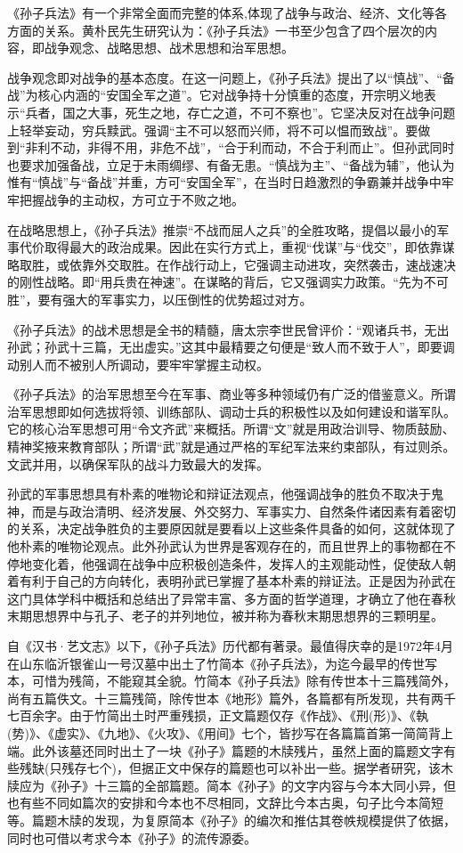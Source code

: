 \documentclass[12pt,UTF8]{ctexbook}
\begin{document}
《孙子兵法》有一个非常全面而完整的体系,体现了战争与政治、经济、文化等各方面的关系。黄朴民先生研究认为：《孙子兵法》一书至少包含了四个层次的内容，即战争观念、战略思想、战术思想和治军思想。

战争观念即对战争的基本态度。在这一问题上，《孙子兵法》提出了以“慎战”、“备战”为核心内涵的“安国全军之道”。它对战争持十分慎重的态度，开宗明义地表示“兵者，国之大事，死生之地，存亡之道，不可不察也”。它坚决反对在战争问题上轻举妄动，穷兵黩武。强调“主不可以怒而兴师，将不可以愠而致战”。要做到“非利不动，非得不用，非危不战”，“合于利而动，不合于利而止”。但孙武同时也要求加强备战，立足于未雨绸缪、有备无患。“慎战为主”、“备战为辅”，他认为惟有“慎战”与“备战”并重，方可“安国全军”，在当时日趋激烈的争霸兼并战争中牢牢把握战争的主动权，方可立于不败之地。

在战略思想上，《孙子兵法》推崇“不战而屈人之兵”的全胜攻略，提倡以最小的军事代价取得最大的政治成果。因此在实行方式上，重视“伐谋”与“伐交”，即依靠谋略取胜，或依靠外交取胜。在作战行动上，它强调主动进攻，突然袭击，速战速决的刚性战略。即“用兵贵在神速”。在谋略的背后，它又强调实力政策。“先为不可胜”，要有强大的军事实力，以压倒性的优势超过对方。

《孙子兵法》的战术思想是全书的精髓，唐太宗李世民曾评价：“观诸兵书，无出孙武；孙武十三篇，无出虚实。”这其中最精要之句便是“致人而不致于人”，即要调动别人而不被别人所调动，要牢牢掌握主动权。

《孙子兵法》的治军思想至今在军事、商业等多种领域仍有广泛的借鉴意义。所谓治军思想即如何选拔将领、训练部队、调动士兵的积极性以及如何建设和谐军队。它的核心治军思想可用“令文齐武”来概括。所谓“文”就是用政治训导、物质鼓励、精神奖掖来教育部队；所谓“武”就是通过严格的军纪军法来约束部队，有过则杀。文武并用，以确保军队的战斗力致最大的发挥。

孙武的军事思想具有朴素的唯物论和辩证法观点，他强调战争的胜负不取决于鬼神，而是与政治清明、经济发展、外交努力、军事实力、自然条件诸因素有着密切的关系，决定战争胜负的主要原因就是要看以上这些条件具备的如何，这就体现了他朴素的唯物论观点。此外孙武认为世界是客观存在的，而且世界上的事物都在不停地变化着，他强调在战争中应积极创造条件，发挥人的主观能动性，促使敌人朝着有利于自己的方向转化，表明孙武已掌握了基本朴素的辩证法。正是因为孙武在这门具体学科中概括和总结出了异常丰富、多方面的哲学道理，才确立了他在春秋末期思想界中与孔子、老子的并列地位，被并称为春秋末期思想界的三颗明星。

自《汉书·艺文志》以下，《孙子兵法》历代都有著录。最值得庆幸的是1972年4月在山东临沂银雀山一号汉墓中出土了竹简本《孙子兵法》，为迄今最早的传世写本，可惜为残简，不能窥其全貌。竹简本《孙子兵法》除有传世本十三篇残简外，尚有五篇佚文。十三篇残简，除传世本《地形》篇外，各篇都有所发现，共有两千七百余字。由于竹简出土时严重残损，正文篇题仅存《作战》、《刑(形)》、《執(势)》、《虚实》、《九地》、《火攻》、《用间》七个，皆抄写在各篇篇首第一简简背上端。此外该墓还同时出土了一块《孙子》篇题的木牍残片，虽然上面的篇题文字有些残缺(只残存七个)，但据正文中保存的篇题也可以补出一些。据学者研究，该木牍应为《孙子》十三篇的全部篇题。简本《孙子》的文字内容与今本大同小异，但也有些不同如篇次的安排和今本也不尽相同，文辞比今本古奥，句子比今本简短等。篇题木牍的发现，为复原简本《孙子》的编次和推估其卷帙规模提供了依据，同时也可借以考求今本《孙子》的流传源委。
\end{document}
